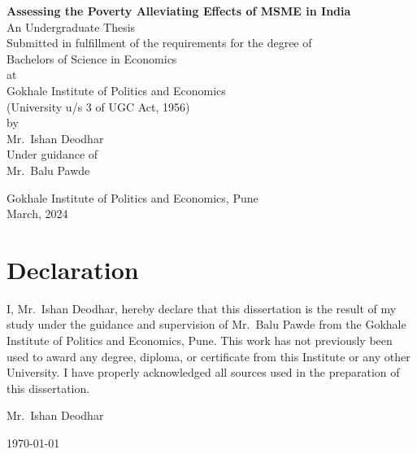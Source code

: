 \documentclass [12pt]{article}
\begin{document}
\begin{titlepage}
    \centering
    \vspace*{1cm}

    \LARGE \textbf{Assessing the Poverty Alleviating Effects of MSME in India}\\[0.5cm]

    \Large{An Undergraduate Thesis}\\[2cm]

    \normalsize Submitted in fulfillment of the requirements for the degree of\\
    Bachelors of Science in Economics\\[2cm]

    \normalsize at\\
    Gokhale Institute of Politics and Economics\\
    (University u/s 3 of UGC Act, 1956)\\[1cm]

    \normalsize by\\
    Mr.\ Ishan Deodhar\\[0.5cm]
    
    \normalsize Under guidance of\\
    Mr.\ Balu Pawde\\[1cm]

    \vspace*{3cm}

    Gokhale Institute of Politics and Economics, Pune\\
    March, 2024\\[2cm]

\end{titlepage}

\newpage
{}
\section*{Declaration}

\normalsize
I, Mr.\ Ishan Deodhar, hereby declare that this dissertation is the result of my study under the guidance and supervision of Mr.\ Balu Pawde from the Gokhale Institute of Politics and Economics, Pune. This work has not previously been used to award any degree, diploma, or certificate from this Institute or any other University. I have properly acknowledged all sources used in the preparation of this dissertation.
\vspace{16cm}

Mr.\ Ishan Deodhar

\today
\end{document}
